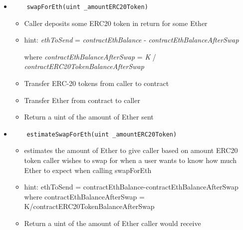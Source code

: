 \documentclass[10pt]{article}
\begin{document}
\begin{itemize}
\begin{itemize}
      {\it \_liquidityPositionsToBurn} * {\it contractERC20TokenBalance} / {\it totalLiquidityPositions}
    \item Decrement the caller’s liquidity positions and the total liquidity positions
    \item Caller shouldn’t be able to give up more liquidity positions than they own
    \item Caller shouldn’t be able to give up all the liquidity positions in the pool
    \item Update K: K = newContractEthBalance * newContractERC20TokenBalance
    \item Transfer Ether and ERC-20 from contract to caller
    \item Return 2 uints, the amount of ERC20 tokens sent and the amount of Ether sent
\end{itemize}

\item
\begin{verbatim}
    swapForEth(uint _amountERC20Token)
\end{verbatim}
\begin{itemize}
    \item Caller deposits some ERC20 token in return for some Ether 
    \item hint: {\it ethToSend} = 
    {\it contractEthBalance} - {\it contractEthBalanceAfterSwap} 
    
    where {\it contractEthBalanceAfterSwap} = 
    {\it K} / {\it contractERC20TokenBalanceAfterSwap}
    \item Transfer ERC-20 tokens from caller to contract
    \item Transfer Ether from contract to caller
    \item Return a uint of the amount of Ether sent
\end{itemize}

\item
\begin{verbatim}
    estimateSwapForEth(uint _amountERC20Token)
\end{verbatim}
\begin{itemize}
    \item estimates the amount of Ether to give caller based on amount ERC20 token caller wishes to swap for when a user wants to know how much Ether to expect when calling swapForEth
    \item hint: ethToSend = contractEthBalance-contractEthBalanceAfterSwap where contractEthBalanceAfterSwap = K/contractERC20TokenBalanceAfterSwap
    \item Return a uint of the amount of Ether caller would receive
\end{itemize}


\end{itemize}
\end{document}
